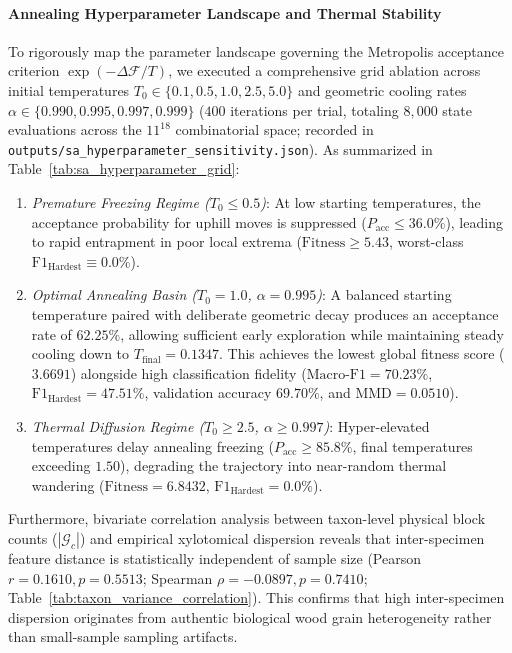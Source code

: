 \documentclass[a4paper,fleqn]{cas-sc}
\begin{document}
\paragraph{Annealing Hyperparameter Landscape and Thermal Stability}
To rigorously map the parameter landscape governing the Metropolis acceptance criterion $\exp(-\Delta \mathcal{F} / T)$, we executed a comprehensive grid ablation across initial temperatures $T_0 \in \{0.1, 0.5, 1.0, 2.5, 5.0\}$ and geometric cooling rates $\alpha \in \{0.990, 0.995, 0.997, 0.999\}$ ($400$ iterations per trial, totaling $8{,}000$ state evaluations across the $11^{18}$ combinatorial space; recorded in \texttt{outputs/sa\_hyperparameter\_sensitivity.json}). As summarized in Table~\ref{tab:sa_hyperparameter_grid}:
\begin{enumerate}
\item \emph{Premature Freezing Regime ($T_0 \le 0.5$)}: At low starting temperatures, the acceptance probability for uphill moves is suppressed ($P_{\text{acc}} \le 36.0\%$), leading to rapid entrapment in poor local extrema ($\text{Fitness} \ge 5.43$, worst-class $\mathrm{F1}_{\text{Hardest}} \equiv 0.0\%$).
\item \emph{Optimal Annealing Basin ($T_0 = 1.0$, $\alpha = 0.995$)}: A balanced starting temperature paired with deliberate geometric decay produces an acceptance rate of $62.25\%$, allowing sufficient early exploration while maintaining steady cooling down to $T_{\text{final}} = 0.1347$. This achieves the lowest global fitness score ($3.6691$) alongside high classification fidelity ($\text{Macro-F1} = 70.23\%$, $\mathrm{F1}_{\text{Hardest}} = 47.51\%$, validation accuracy $69.70\%$, and $\mathrm{MMD} = 0.0510$).
\item \emph{Thermal Diffusion Regime ($T_0 \ge 2.5$, $\alpha \ge 0.997$)}: Hyper-elevated temperatures delay annealing freezing ($P_{\text{acc}} \ge 85.8\%$, final temperatures exceeding $1.50$), degrading the trajectory into near-random thermal wandering ($\text{Fitness} = 6.8432$, $\mathrm{F1}_{\text{Hardest}} = 0.0\%$).
\end{enumerate}

Furthermore, bivariate correlation analysis between taxon-level physical block counts ($|\mathcal{G}_c|$) and empirical xylotomical dispersion reveals that inter-specimen feature distance is statistically independent of sample size (Pearson $r = 0.1610, p = 0.5513$; Spearman $\rho = -0.0897, p = 0.7410$; Table~\ref{tab:taxon_variance_correlation}). This confirms that high inter-specimen dispersion originates from authentic biological wood grain heterogeneity rather than small-sample sampling artifacts.
\end{document}

